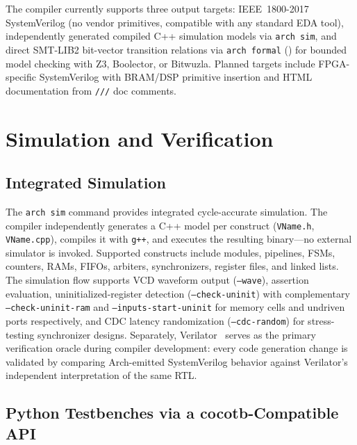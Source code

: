 \documentclass[manuscript]{acmart}
\begin{document}
The compiler currently supports three output targets:
IEEE~1800-2017 SystemVerilog (no vendor primitives, compatible with any standard EDA tool),
independently generated compiled C++ simulation models via \texttt{arch sim},
and direct SMT-LIB2 bit-vector transition relations via \texttt{arch formal} () for bounded model checking with Z3, Boolector, or Bitwuzla.
Planned targets include FPGA-specific SystemVerilog with BRAM/DSP primitive insertion and HTML documentation from \texttt{///} doc comments.

\section{Simulation and Verification}\label{sec:sim}

\subsection{Integrated Simulation}

The \texttt{arch sim} command provides integrated cycle-accurate simulation. The compiler independently generates a C++ model per construct (\texttt{VName.h}, \texttt{VName.cpp}), compiles it with \texttt{g++}, and executes the resulting binary---no external simulator is invoked. Supported constructs include modules, pipelines, FSMs, counters, RAMs, FIFOs, arbiters, synchronizers, register files, and linked lists. The simulation flow supports VCD waveform output (\texttt{--wave}), assertion evaluation, uninitialized-register detection (\texttt{--check-uninit}) with complementary \texttt{--check-uninit-ram} and \texttt{--inputs-start-uninit} for memory cells and undriven ports respectively, and CDC latency randomization (\texttt{--cdc-random}) for stress-testing synchronizer designs. Separately, Verilator~\cite{verilator} serves as the primary verification oracle during compiler development: every code generation change is validated by comparing Arch-emitted SystemVerilog behavior against Verilator's independent interpretation of the same RTL.

\subsection{Python Testbenches via a cocotb-Compatible API}\label{sec:cocotb}
\end{document}
